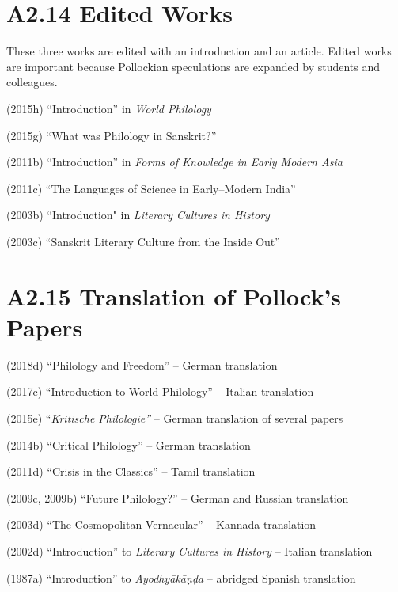 
\section*{A2.14 Edited Works}

These three works are edited with an introduction and an article. Edited works are important because Pollockian speculations are expanded by students and colleagues.

(2015h) “Introduction” in \textit{World Philology}

(2015g) “What was Philology in Sanskrit?”

(2011b) “Introduction” in \textit{Forms of Knowledge in Early Modern Asia}

(2011c) “The Languages of Science in Early–Modern India”

(2003b) “Introduction" in \textit{Literary Cultures in History}

(2003c) “Sanskrit Literary Culture from the Inside Out”

\vspace{-.3cm}

\section*{A2.15 Translation of Pollock’s Papers}

(2018d) “Philology and Freedom” – German translation

(2017c) “Introduction to World Philology” – Italian translation

(2015e) “\textit{Kritische Philologie”} – German translation of several  papers

(2014b) “Critical Philology” – German translation

(2011d) “Crisis in the Classics” – Tamil translation

(2009c, 2009b) “Future Philology?” – German and Russian translation

(2003d) “The Cosmopolitan Vernacular” – Kannada translation

(2002d) “Introduction” to \textit{Literary Cultures in History} – Italian translation

(1987a) “Introduction” to \textit{Ayodhyākāṇḍa} – abridged Spanish translation

